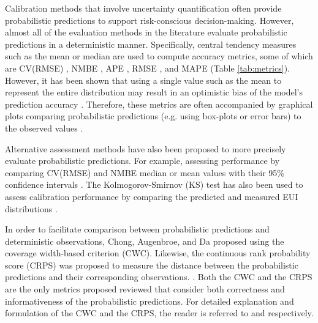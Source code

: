 \documentclass[review]{elsarticle}
\begin{document}
Calibration methods that involve uncertainty quantification often provide probabilistic predictions to support risk-conscious decision-making. However, almost all of the evaluation methods in the literature evaluate probabilistic predictions in a deterministic manner. Specifically, central tendency measures such as the mean or median are used to compute accuracy metrics, some of which are CV(RMSE) \cite{lim2018influences, chong2018guidelines, lim2017comprehensive, chong2017bayesian, yuan2017simultaneous, sokol2017validation, kim2016stepwise, heo2015evaluation, wang2020bayesian, kristensen2020long}, NMBE \cite{chong2018guidelines, chong2017bayesian, kim2016stepwise, kristensen2020long}, APE \cite{cerezo2017comparison, yuan2017simultaneous, sokol2017validation, wang2020bayesian}, RMSE \cite{lim2017comprehensive, heo2015evaluation, tardioli2020methodology}, and MAPE \cite{tardioli2020methodology} (Table \ref{tab:metrics}). However, it has been shown that using a single value such as the mean to represent the entire distribution may result in an optimistic bias of the model's prediction accuracy \cite{chong2019continuous}. Therefore, these metrics are often accompanied by graphical plots comparing probabilistic predictions (e.g. using box-plots or error bars) to the observed values \cite{chong2018guidelines, kristensen2018hierarchical, yuan2017simultaneous, heo2015evaluation, kristensen2020long}. 

Alternative assessment methods have also been proposed to more precisely evaluate probabilistic predictions. For example, assessing performance by comparing CV(RMSE) and NMBE median or mean values with their 95\% confidence intervals \cite{kristensen2018hierarchical, nagpal2019framework, zhu2020uncertainty}. The Kolmogorov-Smirnov (KS) test has also been used to assess calibration performance by comparing the predicted and measured EUI distributions \cite{cerezo2017comparison, sokol2017validation}.

In order to facilitate comparison between probabilistic predictions and deterministic observations, Chong, Augenbroe, and Da \cite{chong2021occupancy} proposed using the coverage width-based criterion (CWC). Likewise, the continuous rank probability score (CRPS) was proposed to measure the distance between the probabilistic predictions and their corresponding observations. \cite{li2016assessment}. Both the CWC and the CRPS are the only metrics proposed reviewed that consider both correctness and informativeness of the probabilistic predictions. For detailed explanation and formulation of the CWC and the CRPS, the reader is referred to \cite{chong2021occupancy} and \cite{gneiting2007strictly} respectively. 
\end{document}
